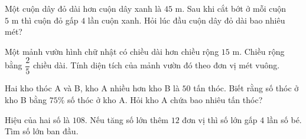 \begin{ex} %
Một cuộn dây đỏ dài hơn cuộn dây xanh là $45\text{ m}$. Sau khi cắt bớt ở mỗi cuộn $5\text{ m}$ thì cuộn đỏ gấp $4$ lần cuộn xanh. Hỏi lúc đầu cuộn dây đỏ dài bao nhiêu mét?
\end{ex}

\begin{ex} %
Một mảnh vườn hình chữ nhật có chiều dài hơn chiều rộng $15\text{ m}$. Chiều rộng bằng $\dfrac{2}{5}$ chiều dài. Tính diện tích của mảnh vườn đó theo đơn vị mét vuông.
\end{ex}

\begin{ex} %
Hai kho thóc A và B, kho A nhiều hơn kho B là $50$ tấn thóc. Biết rằng số thóc ở kho B bằng $75\%$ số thóc ở kho A. Hỏi kho A chứa bao nhiêu tấn thóc?
\end{ex}

\begin{ex} %
Hiệu của hai số là $108$. Nếu tăng số lớn thêm $12$ đơn vị thì số lớn gấp $4$ lần số bé. Tìm số lớn ban đầu.
\end{ex}
